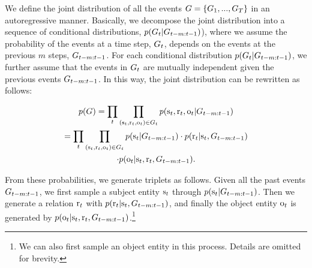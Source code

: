 We define the joint distribution of all the events $G = \{G_{1}, ..., G_{T}\}$ in an autoregressive manner.
Basically, we decompose the joint distribution into a sequence of conditional distributions, $p(G_t|G_{t-m:t-1})$), where 
we assume the probability of the events at a time step, $G_t$, depends on the events at the previous $m$ steps, $G_{t-m:t-1}$. 
For each conditional distribution $p(G_t|G_{t-m:t-1})$, we further assume that the events in $G_t$ are mutually independent given the previous events $G_{t-m:t-1}$. In this way, the joint distribution can be rewritten as follows:

\small
\begin{multline}
\label{eq:prob_event_t}
    p(G)= \prod_{t}\prod_{(\mathrm{s}_t,\mathrm{r}_t,\mathrm{o}_t)\in G_{t}}  p(\mathrm{s}_t,\mathrm{r}_t,\mathrm{o}_t|G_{t-m:t-1})\\
    = \prod_t \prod_{(\mathrm{s}_t,\mathrm{r}_t,\mathrm{o}_t)\in G_t} 
    p(\mathrm{s}_t |G_{t-m:t-1})
    \cdot p(\mathrm{r}_t |\mathrm{s}_t, G_{t-m:t-1})\\
    \cdot p(\mathrm{o}_t|\mathrm{s}_t,\mathrm{r}_t,G_{t-m:t-1}).
\end{multline}
\normalsize



From these probabilities, we generate triplets as follows.
Given all the past events $G_{t-m:t-1}$, we first sample a subject entity $\mathrm{s}_t$ through $p(\mathrm{s}_t |G_{t-m:t-1})$. Then we generate a relation $\mathrm{r}_t$ with $p(\mathrm{r}_t |\mathrm{s}_t, G_{t-m:t-1})$, and finally the object entity $\mathrm{o}_t$ is generated by $p(\mathrm{o}_t|\mathrm{s}_t,\mathrm{r}_t,G_{t-m:t-1})$.\footnote{We can also first sample an object entity in this process. Details are omitted for brevity.}



